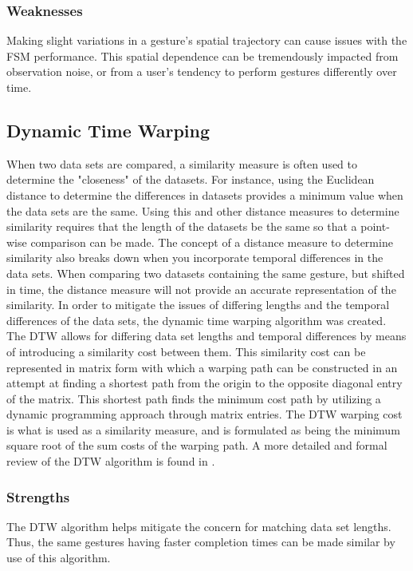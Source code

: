 \documentclass[conference]{IEEEtran}
\begin{document}
\subsubsection{Weaknesses}
Making slight variations in a gesture's spatial trajectory can cause issues with the FSM performance. This spatial dependence can be tremendously impacted from observation noise, or from a user's tendency to perform gestures differently over time.


\subsection{Dynamic Time Warping}
When two data sets are compared, a similarity measure is often used to determine the "closeness" of the datasets. For instance, using the Euclidean distance to determine the differences in datasets provides a minimum value when the data sets are the same. Using this and other distance measures to determine similarity requires that the length of the datasets be the same so that a point-wise comparison can be made. The concept of a distance measure to determine similarity also breaks down when you incorporate temporal differences in the data sets. When comparing two datasets containing the same gesture, but shifted in time, the distance measure will not provide an accurate representation of the similarity. In order to mitigate the issues of differing lengths and the temporal differences of the data sets, the dynamic time warping algorithm was created. The DTW allows for differing data set lengths and temporal differences by means of introducing a similarity cost between them. This similarity cost can be represented in matrix form with which a warping path can be constructed in an attempt at finding a shortest path from the origin to the opposite diagonal entry of the matrix. This shortest path finds the minimum cost path by utilizing a dynamic programming approach through matrix entries. The DTW warping cost is what is used as a similarity measure, and is formulated as being the minimum square root of the sum costs of the warping path. A more detailed and formal review of the DTW algorithm is found in \cite{DTW}. 

\subsubsection{Strengths}
The DTW algorithm helps mitigate the concern for matching data set lengths. Thus, the same gestures having faster completion times can be made similar by use of this algorithm. 
\end{document}
